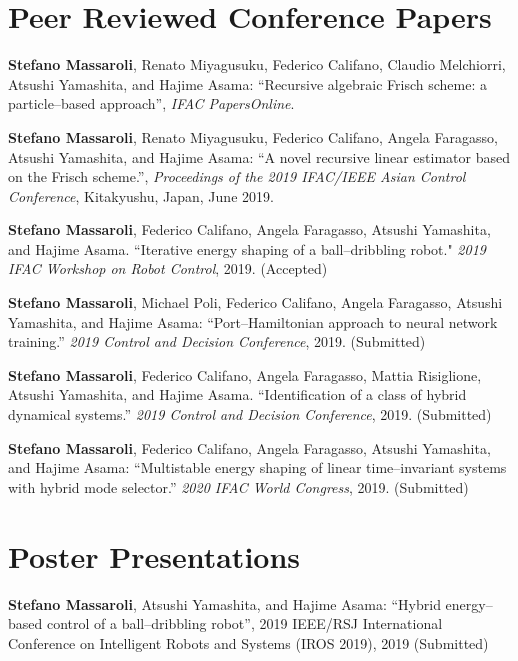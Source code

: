 \section*{Peer Reviewed Conference Papers}
\begin{enumerate}[{[}c1{]}]
\item \textbf{Stefano Massaroli}, Renato Miyagusuku, Federico Califano, Claudio Melchiorri, Atsushi Yamashita, and Hajime Asama: ``Recursive algebraic Frisch scheme: a particle--based approach'', \textit{IFAC PapersOnline}.
%
\item \textbf{Stefano Massaroli}, Renato Miyagusuku, Federico Califano, Angela Faragasso, Atsushi Yamashita, and Hajime Asama: ``A novel recursive linear estimator based on the Frisch scheme.'', \textit{Proceedings of the 2019 IFAC/IEEE Asian Control Conference}, Kitakyushu, Japan, June 2019.
%
\item \textbf{Stefano Massaroli}, Federico Califano, Angela Faragasso, Atsushi Yamashita, and
Hajime Asama. ``Iterative energy shaping of a ball--dribbling robot." \textit{2019 IFAC Workshop on Robot Control}, 2019. (Accepted)
%
\item \textbf{Stefano Massaroli}, Michael Poli, Federico Califano, Angela Faragasso, Atsushi Yamashita, and Hajime Asama: ``Port--Hamiltonian approach to neural network training.'' \textit{2019 Control and Decision Conference}, 2019. (Submitted)
%
\item \textbf{Stefano Massaroli}, Federico Califano, Angela Faragasso, Mattia Risiglione, Atsushi
Yamashita, and Hajime Asama. ``Identification of a class of hybrid dynamical systems.'' \textit{2019 Control and Decision Conference}, 2019. (Submitted)
%
\item \textbf{Stefano Massaroli}, Federico Califano, Angela Faragasso, Atsushi Yamashita, and Hajime Asama: ``Multistable energy shaping of linear time--invariant systems with hybrid mode selector.'' \textit{2020 IFAC World Congress}, 2019. (Submitted)
%
\end{enumerate}

\section*{Poster Presentations}
\begin{enumerate}[{[}1{]}]
\item \textbf{Stefano Massaroli}, Atsushi Yamashita, and Hajime Asama: ``Hybrid energy--based control of a ball--dribbling robot'', 2019 IEEE/RSJ International Conference on Intelligent Robots and Systems (IROS 2019), 2019 (Submitted)%
\end{enumerate}

